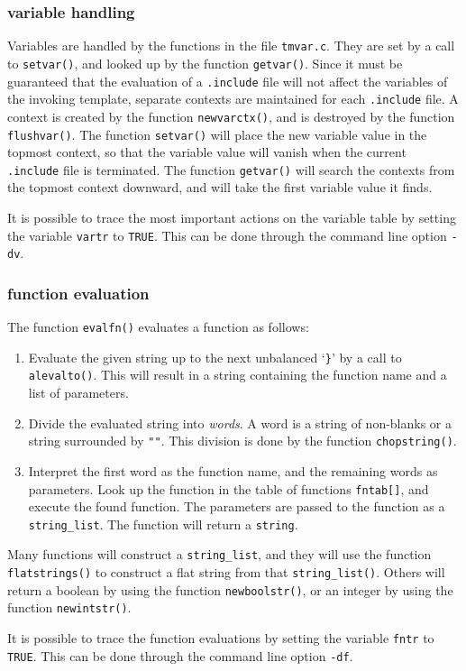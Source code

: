 \subsubsection{variable handling}
Variables are handled by the functions in the file {\tt tmvar.c}.
They are set by a call to {\tt setvar()},
and looked up by the function {\tt getvar()}.
Since it must be guaranteed that the evaluation of a {\tt .include} file
will not affect the variables of the invoking template, separate contexts
are maintained for each {\tt .include} file.
A context is created by the function {\tt newvarctx()},
and is destroyed by the function {\tt flushvar()}.
The function {\tt setvar()} will place the new variable value in the topmost
context, so that the variable value will vanish when the current
{\tt .include} file is terminated.
The function {\tt getvar()} will search the contexts from the topmost
context downward, and will take the first variable value it finds.
\par
It is possible to trace the most important actions
on the variable table by setting the variable {\tt vartr} to {\tt TRUE}.
This can be done through the command line option {\tt -dv}.
\subsubsection{function evaluation}
The function {\tt evalfn()} evaluates a function as follows:
\begin{enumerate}
\item Evaluate the given string up to the next unbalanced `\verb!}!'
      by a call to {\tt alevalto()}.
      This will result in a string containing the function name and a list of
      parameters.

\item Divide the evaluated string into {\em words}. A word is a
      string of non-blanks or a string surrounded by \verb!""!.
      This division is done by the function {\tt chopstring()}.

\item Interpret the first word as the function name, and the
      remaining words as parameters.
      Look up the function in the table of functions {\tt fntab[]},
      and execute the found function. The parameters are passed
      to the function as a {\tt string\_list}. The function
      will return a {\tt string}.
\end{enumerate}
Many functions will construct a {\tt string\_list},
and they will use the function {\tt flatstrings()} to construct
a flat string from that {\tt string\_list()}.
Others will return a boolean by using the function {\tt newboolstr()},
or an integer by using the function {\tt newintstr()}.
\par
It is possible to trace the function evaluations
by setting the variable {\tt fntr} to {\tt TRUE}.
This can be done through the command line option {\tt -df}.
